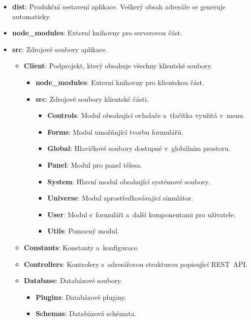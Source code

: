 \documentclass[a4paper,12pt]{article}
\begin{document}
\begin{itemize}
\item \textbf{dist}: Produkční sestavení aplikace. Veškerý obsah adresáře se generuje automaticky.
\item \textbf{node\_modules}: Externí knihovny pro serverovou část.
\item \textbf{src}: Zdrojové soubory aplikace.

\begin{itemize}
\item \textbf{Client}: Podprojekt, který obsahuje všechny klientské soubory.

\begin{itemize}
\item \textbf{node\_modules}: Externí knihovny pro klientskou část.
\item \textbf{src}:  Zdrojové soubory klientské části.

\begin{itemize}
\item \textbf{Controls}: Modul obsahující ovladače a~tlačítka využitá v~menu.
\item \textbf{Forms}: Modul umožňující tvorbu formulářů.
\item \textbf{Global}: Hlavičkové soubory dostupné v~globálním prostoru.
\item \textbf{Panel}: Modul pro panel tělesa.
\item \textbf{System}: Hlavní modul obsahující systémové soubory.
\item \textbf{Universe}: Modul zprostředkovávající simulátor.
\item \textbf{User}: Modul s~formuláři a~další komponentami pro uživatele.
\item \textbf{Utils}: Pomocný modul.
\end{itemize} 

\end{itemize} 

\item \textbf{Constants}: Konstanty a~konfigurace.
\item \textbf{Controllers}: Kontrolery s~adresářovou strukturou popisující REST~API.
\item \textbf{Database}: Databázové soubory.

\begin{itemize}
\item \textbf{Plugins}: Databázové pluginy.
\item \textbf{Schemas}: Databázová schémata.
\end{itemize} 


\end{itemize}
\end{itemize}
\end{document}
